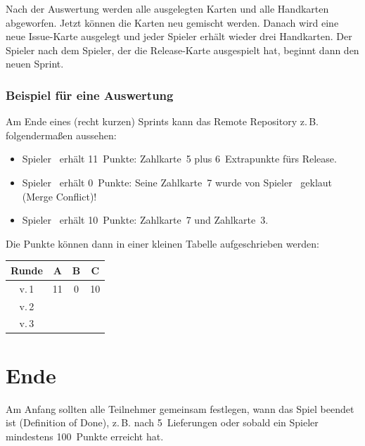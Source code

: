 \documentclass[DIV=15, fontsize=11pt]{gitgame}
\begin{document}
Nach der Auswertung werden alle ausgelegten Karten und alle Handkarten abgeworfen. Jetzt können die Karten neu gemischt werden. Danach wird eine neue Issue-Karte ausgelegt und jeder Spieler erhält wieder drei Handkarten. Der Spieler nach dem Spieler, der die Release-Karte ausgespielt hat, beginnt dann den neuen Sprint.


\subsubsection*{Beispiel für eine Auswertung}
Am Ende eines (recht kurzen) Sprints kann das Remote Repository z.\,B. folgendermaßen aussehen:

\begin{center}
\end{center}

\begin{itemize}
	\item Spieler~ erhält 11~Punkte: Zahlkarte~5 plus 6~Extrapunkte fürs Release.
	\item Spieler~ erhält 0~Punkte: Seine Zahlkarte~7 wurde von Spieler~ geklaut (Merge Conflict)!
	\item Spieler~ erhält 10~Punkte: Zahlkarte~7 und Zahlkarte~3.
\end{itemize}

\medskip

Die Punkte können dann in einer kleinen Tabelle aufgeschrieben werden:
\hfill
\begin{tabular}[t]{c|c|c|c}
	Runde & A & B & C \\
	\hline
	v.\,1 & 11 & 0 & 10 \\
	\hline
	v.\,2 &  & & \\
	\hline
	v.\,3 &  & & \\
\end{tabular}



\section{Ende\label{ende}}
Am Anfang sollten alle Teilnehmer gemeinsam festlegen, wann das Spiel beendet ist (Definition of Done), z.\,B. nach 5~Lieferungen oder sobald ein Spieler mindestens 100~Punkte erreicht hat.
\end{document}
